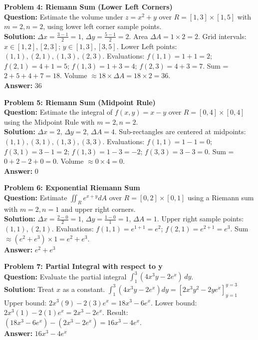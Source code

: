 \documentclass[11pt]{article}
\begin{document}
\vspace{0.5cm}
\noindent\textbf{Problem 4: Riemann Sum (Lower Left Corners)} \\
\textbf{Question:} Estimate the volume under $z = x^2+y$ over $R = [1,3] \times [1,5]$ with $m=2, n=2$, using lower left corner sample points. \\
\textbf{Solution:} 
$\Delta x = \frac{3-1}{2} = 1$, $\Delta y = \frac{5-1}{2} = 2$. Area $\Delta A = 1 \times 2 = 2$.
Grid intervals: $x \in [1,2], [2,3]$; $y \in [1,3], [3,5]$.
Lower Left points: $(1,1), (2,1), (1,3), (2,3)$.
Evaluations: $f(1,1) = 1+1=2$; $f(2,1) = 4+1=5$; $f(1,3) = 1+3=4$; $f(2,3) = 4+3=7$.
Sum = $2 + 5 + 4 + 7 = 18$.
Volume $\approx 18 \times \Delta A = 18 \times 2 = 36$. \\
\textbf{Answer:} 36

\vspace{0.5cm}
\noindent\textbf{Problem 5: Riemann Sum (Midpoint Rule)} \\
\textbf{Question:} Estimate the integral of $f(x,y) = x-y$ over $R = [0,4] \times [0,4]$ using the Midpoint Rule with $m=2, n=2$. \\
\textbf{Solution:} 
$\Delta x = 2$, $\Delta y = 2$, $\Delta A = 4$.
Sub-rectangles are centered at midpoints: $(1,1), (3,1), (1,3), (3,3)$.
Evaluations: $f(1,1) = 1-1=0$; $f(3,1) = 3-1=2$; $f(1,3) = 1-3=-2$; $f(3,3) = 3-3=0$.
Sum = $0 + 2 - 2 + 0 = 0$.
Volume $\approx 0 \times 4 = 0$. \\
\textbf{Answer:} 0

\vspace{0.5cm}
\noindent\textbf{Problem 6: Exponential Riemann Sum} \\
\textbf{Question:} Estimate $\iint_R e^{x+y} dA$ over $R = [0,2] \times [0,1]$ using a Riemann sum with $m=2, n=1$ and upper right corners. \\
\textbf{Solution:} 
$\Delta x = \frac{2-0}{2} = 1$, $\Delta y = \frac{1-0}{1} = 1$, $\Delta A = 1$.
Upper right sample points: $(1,1), (2,1)$.
Evaluations: $f(1,1) = e^{1+1} = e^2$; $f(2,1) = e^{2+1} = e^3$.
Sum $\approx (e^2 + e^3) \times 1 = e^2 + e^3$. \\
\textbf{Answer:} $e^2 + e^3$

\vspace{0.5cm}
\noindent\textbf{Problem 7: Partial Integral with respect to y} \\
\textbf{Question:} Evaluate the partial integral $\int_1^3 (4x^3 y - 2e^x) \, dy$. \\
\textbf{Solution:} Treat $x$ as a constant.
$\int_1^3 (4x^3 y - 2e^x) dy = \left[ 2x^3 y^2 - 2y e^x \right]_{y=1}^{y=3}$
Upper bound: $2x^3(9) - 2(3)e^x = 18x^3 - 6e^x$.
Lower bound: $2x^3(1) - 2(1)e^x = 2x^3 - 2e^x$.
Result: $(18x^3 - 6e^x) - (2x^3 - 2e^x) = 16x^3 - 4e^x$. \\
\textbf{Answer:} $16x^3 - 4e^x$
\end{document}
